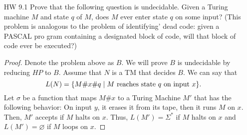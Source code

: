 \documentclass{article}
\newcommand{\es}{\varnothing}
\newcommand{\setst}{\hspace{1mm} | \hspace{1mm} }
\theoremstyle{definition}
\newtheorem*{solution*}{Solution}
\begin{document}
\begin{enumerate}
\begin{solution*}
		Here is an example on a string of length 3. 
		\begin{align*}
		&\vdash aaa\textvisiblespace\ldots \\
		&\vdash aaa \dashv\textvisiblespace\ldots \\
		&\vdash \bar{a}\bar{a}\bar{a} \dashv\textvisiblespace\ldots \\
		&\vdash\$ \bar{a}\bar{a}\bar{a} \dashv \textvisiblespace\ldots\\
		&\vdash\hat{a}\hat{a}\hat{a}\$ \bar{a}\bar{a}\bar{a} \dashv\textvisiblespace\ldots \\
		&\vdash\hat{a}\hat{a}\$ \bar{a}\bar{a}\bar{a} \dashv\textvisiblespace\ldots \\
		&\vdash\textvisiblespace\hat{a}\$ \bar{a}\bar{a}\bar{a} \dashv\textvisiblespace\ldots\quad\text{ in 3 ``steps'' we get} \\
		&\vdash\textvisiblespace\hat{a}\$ \tilde{a}\tilde{a}\tilde{a}aaa \dashv\textvisiblespace\ldots \\
		&\vdash\textvisiblespace\hat{a}\$ \bar{a}\bar{a}\bar{a}aaa \dashv\textvisiblespace\ldots \\
		&\vdash\textvisiblespace\textvisiblespace\$ \bar{a}\bar{a}\bar{a}aaa \dashv\textvisiblespace\ldots \\
		&\vdash\textvisiblespace\textvisiblespace\$ \tilde{a}\tilde{a}\tilde{a}aaaaaa \dashv\textvisiblespace\ldots \\
		&\vdash\tilde{a}\tilde{a}\tilde{a}aaaaaa \dashv\textvisiblespace\ldots \\
		&\vdash aaaaaaaaa \dashv\textvisiblespace\ldots \\
		\end{align*}
		The main idea of the algorithm is that the $\hat{a}$ keep track how many times we want to multiply the string's length by itself. We only want $m-1\ \hat{a}$'s since we already have a $m$ $a$'s on the tape. Each time we say a $\hat{a}$, we increase the number of $a$'s on the right side by $m$. So, at the end of this process, the number of $a$'s on the right side will be $m + (m-1)m = m^2$. 
	\end{solution*}
	\item[HW 9.1] Prove that the following question is undecidable. Given a Turing machine $M$ and state $q$ of $M$, does $M$ ever enter state $q$ on some input?
	(This problem is analogous to the problem of identifying' dead code:
	given a PASCAL pro gram containing a designated block of code, will
	that block of code ever be executed?)
	\begin{proof}
		Denote the problem above as $B$. We will prove $B$ is undecidable by reducing $HP$ to $B$. Assume that $N$ is a TM that decides $B$. We can say that 
		\[L(N) = \{M\#x\#q \setst M \text{ reaches state } q \text{ on input } x\}.\]
		Let $\sigma$ be a function that maps $M\#x$ to a Turing Machine $M'$ that has the following behavior: On input $y$, it erases it from its tape, then it runs $M$ on $x$. Then, $M'$ accepts if $M$ halts on $x$. Thus, $L(M') = \Sigma^*$ if $M$ halts on $x$ and $L(M') = \es$ if $M$ loops on $x$. 
		

\end{proof}
\end{enumerate}
\end{document}
